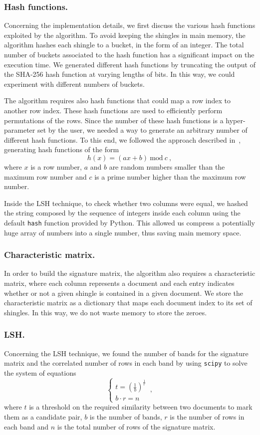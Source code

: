 \documentclass[runningheads]{llncs}
\begin{document}
\subsubsection{Hash functions.} Concerning the implementation details, we first discuss the various hash functions exploited by the algorithm. To avoid keeping the shingles in main memory, the algorithm hashes each shingle to a bucket, in the form of an integer. The total number of buckets associated to the hash function has a significant impact on the execution time. We generated different hash functions by truncating the output of the SHA-256 hash function at varying lengths of bits. In this way, we could experiment with different numbers of buckets.  

The algorithm requires also hash functions that could map a row index to another row index. These hash functions are used to efficiently perform permutations of the rows. Since the number of these hash functions is a hyper-parameter set by the user, we needed a way to generate an arbitrary number of different hash functions. To this end, we followed the approach described in~\cite{liu_2015}, generating hash functions of the form
\[
  h(x) = (ax + b)~\text{mod}~c~,  
\]
where $x$ is a row number, $a$ and $b$ are random numbers smaller than the maximum row number and $c$ is a prime number higher than the maximum row number.

Inside the LSH technique, to check whether two columns were equal, we hashed the string composed by the sequence of integers inside each column using the default \texttt{hash} function provided by Python. This allowed us compress a potentially huge array of numbers into a single number, thus saving main memory space. 

\subsubsection{Characteristic matrix.} In order to build the signature matrix, the algorithm also requires a characteristic matrix, where each column represents a document and each entry indicates whether or not a given shingle is contained in a given document. We store the characteristic matrix as a dictionary that maps each document index to its set of shingles. In this way, we do not waste memory to store the zeroes.

\subsubsection{LSH.} Concerning the LSH technique, we found the number of bands for the signature matrix and the correlated number of rows in each band by using \texttt{scipy} to solve the system of equations
\begin{equation}
  \begin{cases}
    t = (\frac{1}{b})^\frac{1}{r}\\
    b \cdot r = n
  \end{cases}\,,
\end{equation}
where $t$ is a threshold on the required similarity between two documents to mark them as a candidate pair, $b$ is the number of bands, $r$ is the number of rows in each band and $n$ is the total number of rows of the signature matrix.
\end{document}

